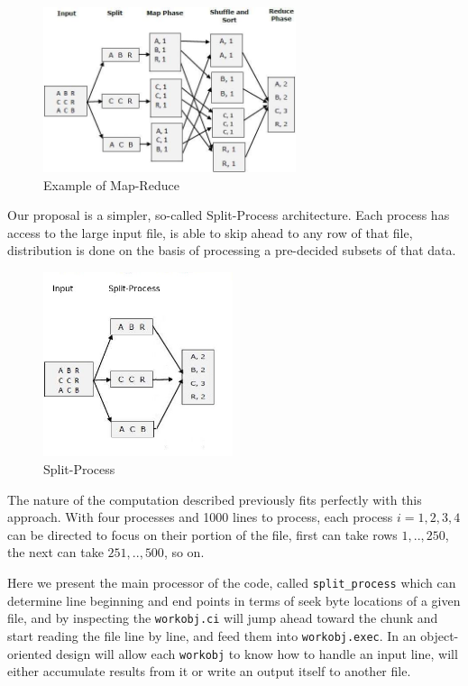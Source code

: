 \documentclass{article}
\begin{document}
\begin{figure}[h]
  \centering
  \includegraphics[width=20em]{mapreduce1.jpg}
  \caption{Example of Map-Reduce}
  \label{fig:mapreduce1}
\end{figure}

Our proposal is a simpler, so-called Split-Process architecture. Each process
has access to the large input file, is able to skip ahead to any row of that
file, distribution is done on the basis of processing a pre-decided subsets of
that data.

\begin{figure}[h]
  \centering
  \includegraphics[width=15em]{splitprocess.jpg}
  \caption{Split-Process}
  \label{fig:mapreduce1}
\end{figure}

The nature of the computation described previously fits perfectly with this
approach. With four processes and 1000 lines to process, each process
$i=1,2,3,4$ can be directed to focus on their portion of the file, first can
take rows $1,..,250$, the next can take $251,..,500$, so on.

Here we present the main processor of the code, called \verb!split_process!
which can determine line beginning and end points in terms of seek byte
locations of a given file, and by inspecting the \verb!workobj.ci! will
jump ahead toward the chunk and start reading the file line by line, and
feed them into \verb!workobj.exec!. In an object-oriented design will allow each
\verb!workobj! to know how to handle an input line, will either accumulate
results from it or write an output itself to another file.
\end{document}
